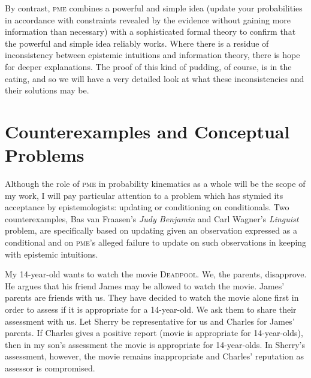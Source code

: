 \documentclass[phd,12pt,oneside]{ubcthesis}
\begin{document}
By contrast, \textsc{pme} combines a powerful and simple idea
(update your probabilities in accordance with constraints revealed by
the evidence without gaining more information than necessary) with a
sophisticated formal theory to confirm that the powerful and simple
idea reliably works. Where there is a residue of inconsistency between
epistemic intuitions and information theory, there is hope for deeper
explanations. The proof of this kind of pudding, of course, is in the
eating, and so we will have a very detailed look at what these
inconsistencies and their solutions may be.

\section{Counterexamples and Conceptual Problems}
\label{sec:ooveisha}

Although the role of \textsc{pme} in probability kinematics as a whole
will be the scope of my work, I will pay particular attention to a
problem which has stymied its acceptance by epistemologists: updating
or conditioning on conditionals. Two counterexamples, Bas van
Fraasen's \emph{Judy Benjamin} and Carl Wagner's \emph{Linguist}
problem, are specifically based on updating given an observation
expressed as a conditional and on \textsc{pme}'s alleged failure to
update on such observations in keeping with epistemic intuitions.

\begin{quotex}
  \label{ex:deadpool} My 14-year-old
  wants to watch the movie \textsc{Deadpool}. We, the parents,
  disapprove. He argues that his friend James may be allowed to watch
  the movie. James' parents are friends with us. They have decided to
  watch the movie alone first in order to assess if it is appropriate
  for a 14-year-old. We ask them to share their assessment with us.
  Let Sherry be representative for us and Charles for James' parents.
  If Charles gives a positive report (movie is appropriate for
  14-year-olds), then in my son's assessment the movie is appropriate
  for 14-year-olds. In Sherry's assessment, however, the movie remains
  inappropriate and Charles' reputation as assessor is compromised.
\end{quotex}
\end{document}
